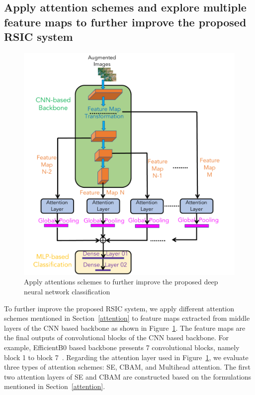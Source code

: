 \documentclass[sigconf]{acmart}
\begin{document}
\subsection{Apply attention schemes and explore multiple feature maps to further improve the proposed RSIC system}
\label{app_att}
\begin{figure}[t]
    \centering
    \includegraphics[width=1.0\linewidth]{CAM_att.pdf}
	\caption{Apply attentions schemes to further improve the proposed deep neural network classification}
    \label{fig:CAM_apply_att}
\end{figure}
To further improve the proposed RSIC system, we apply different attention schemes mentioned in Section~\ref{attention} to feature maps extracted from middle layers of the CNN based backbone as shown in Figure~\ref{fig:CAM_apply_att}.
The feature maps are the final outputs of convolutional blocks of the CNN based backbone.
For example, EfficientB0 based backbone presents 7 convolutional blocks, namely block 1 to block 7~\cite{tan2019efficientnet}.
Regarding the attention layer used in Figure~\ref{fig:CAM_apply_att}, we evaluate three types of attention schemes: SE, CBAM, and Multihead attention.
The first two attention layers of SE and CBAM are constructed based on the formulations mentioned in Section~\ref{attention}.
\end{document}
